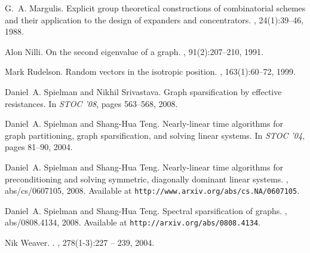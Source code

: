 \documentclass[12pt]{article}
\begin{document}
\begin{thebibliography}{11}
G.~A. Margulis.
\newblock Explicit group theoretical constructions of combinatorial schemes and
  their application to the design of expanders and concentrators.
, 24(1):39--46, 1988.

Alon Nilli.
\newblock On the second eigenvalue of a graph.
, 91(2):207--210, 1991.

Mark Rudelson.
\newblock Random vectors in the isotropic position.
, 163(1):60--72, 1999.

Daniel~A. Spielman and Nikhil Srivastava.
\newblock Graph sparsification by effective resistances.
\newblock In {\em STOC '08}, pages 563--568, 2008.

Daniel~A. Spielman and Shang-Hua Teng.
\newblock Nearly-linear time algorithms for graph partitioning, graph
  sparsification, and solving linear systems.
\newblock In {\em STOC '04}, pages 81--90, 2004.

Daniel~A. Spielman and Shang-Hua Teng.
\newblock Nearly-linear time algorithms for preconditioning and solving
  symmetric, diagonally dominant linear systems.
, abs/cs/0607105, 2008.
\newblock Available at \texttt{http://www.arxiv.org/abs/cs.NA/0607105}.

Daniel~A. Spielman and Shang-Hua Teng.
\newblock Spectral sparsification of graphs.
, abs/0808.4134, 2008.
\newblock Available at \texttt{http://arxiv.org/abs/0808.4134}.

Nik Weaver.
.
, 278(1-3):227 -- 239, 2004.

\end{thebibliography}
\end{document}
